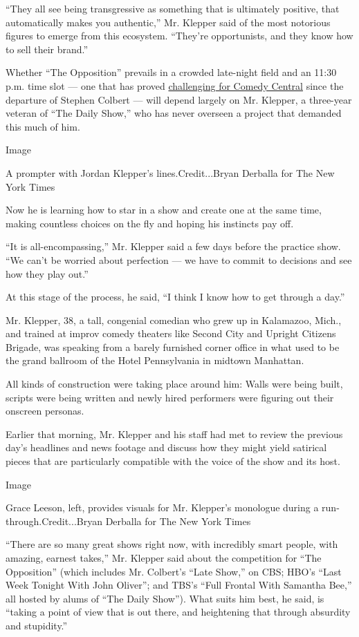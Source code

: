 ``They all see being transgressive as something that is ultimately
positive, that automatically makes you authentic,'' Mr. Klepper said of
the most notorious figures to emerge from this ecosystem. ``They're
opportunists, and they know how to sell their brand.''

Whether ``The Opposition'' prevails in a crowded late-night field and an
11:30 p.m. time slot --- one that has proved
\href{https://www.nytimes3xbfgragh.onion/2016/08/16/business/media/comedy-central-cancels-larry-wilmores-late-night-show.html?mcubz=0}{challenging
for Comedy Central} since the departure of Stephen Colbert --- will
depend largely on Mr. Klepper, a three-year veteran of ``The Daily
Show,'' who has never overseen a project that demanded this much of him.

Image

A prompter with Jordan Klepper's lines.Credit...Bryan Derballa for The
New York Times

Now he is learning how to star in a show and create one at the same
time, making countless choices on the fly and hoping his instincts pay
off.

``It is all-encompassing,'' Mr. Klepper said a few days before the
practice show. ``We can't be worried about perfection --- we have to
commit to decisions and see how they play out.''

At this stage of the process, he said, ``I think I know how to get
through a day.''

Mr. Klepper, 38, a tall, congenial comedian who grew up in Kalamazoo,
Mich., and trained at improv comedy theaters like Second City and
Upright Citizens Brigade, was speaking from a barely furnished corner
office in what used to be the grand ballroom of the Hotel Pennsylvania
in midtown Manhattan.

All kinds of construction were taking place around him: Walls were being
built, scripts were being written and newly hired performers were
figuring out their onscreen personas.

Earlier that morning, Mr. Klepper and his staff had met to review the
previous day's headlines and news footage and discuss how they might
yield satirical pieces that are particularly compatible with the voice
of the show and its host.

Image

Grace Leeson, left, provides visuals for Mr. Klepper's monologue during
a run-through.Credit...Bryan Derballa for The New York Times

``There are so many great shows right now, with incredibly smart people,
with amazing, earnest takes,'' Mr. Klepper said about the competition
for ``The Opposition'' (which includes Mr. Colbert's ``Late Show,'' on
CBS; HBO's ``Last Week Tonight With John Oliver''; and TBS's ``Full
Frontal With Samantha Bee,'' all hosted by alums of ``The Daily Show'').
What suits him best, he said, is ``taking a point of view that is out
there, and heightening that through absurdity and stupidity.''

